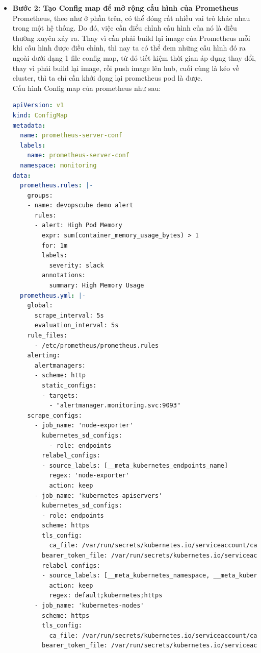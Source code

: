 \begin{itemize}
\begin{lstlisting}[language=yaml]
  \end{lstlisting}
  \item \textbf{Bước 2: Tạo Config map để mở rộng cấu hình của Prometheus}\\[0.2cm]
  Prometheus, theo như ở phần trên, có thể đóng rất nhiều vai trò khác nhau trong một hệ thống. Do đó, việc cần điểu chỉnh cấu hình của nó là điều thường xuyên xảy ra. Thay vì cần phải build lại image của Prometheus mỗi khi cấu hình được điều chỉnh, thì nay ta có thể đem những cấu hình đó ra ngoài dưới dạng 1 file config map, từ đó tiết kiệm thời gian áp dụng thay đổi, thay vì phải build lại image, rồi push image lên hub, cuối cùng là kéo về cluster, thì ta chỉ cần khởi đọng lại prometheus pod là được.\\[0.2cm]
  Cấu hình Config map của prometheus như sau:
  \begin{lstlisting}[language=yaml]
apiVersion: v1
kind: ConfigMap
metadata:
  name: prometheus-server-conf
  labels:
    name: prometheus-server-conf
  namespace: monitoring
data:
  prometheus.rules: |-
    groups:
    - name: devopscube demo alert
      rules:
      - alert: High Pod Memory
        expr: sum(container_memory_usage_bytes) > 1
        for: 1m
        labels:
          severity: slack
        annotations:
          summary: High Memory Usage
  prometheus.yml: |-
    global:
      scrape_interval: 5s
      evaluation_interval: 5s
    rule_files:
      - /etc/prometheus/prometheus.rules
    alerting:
      alertmanagers:
      - scheme: http
        static_configs:
        - targets:
          - "alertmanager.monitoring.svc:9093"
    scrape_configs:
      - job_name: 'node-exporter'
        kubernetes_sd_configs:
          - role: endpoints
        relabel_configs:
        - source_labels: [__meta_kubernetes_endpoints_name]
          regex: 'node-exporter'
          action: keep
      - job_name: 'kubernetes-apiservers'
        kubernetes_sd_configs:
        - role: endpoints
        scheme: https
        tls_config:
          ca_file: /var/run/secrets/kubernetes.io/serviceaccount/ca.crt
        bearer_token_file: /var/run/secrets/kubernetes.io/serviceaccount/token
        relabel_configs:
        - source_labels: [__meta_kubernetes_namespace, __meta_kubernetes_service_name, __meta_kubernetes_endpoint_port_name]
          action: keep
          regex: default;kubernetes;https
      - job_name: 'kubernetes-nodes'
        scheme: https
        tls_config:
          ca_file: /var/run/secrets/kubernetes.io/serviceaccount/ca.crt
        bearer_token_file: /var/run/secrets/kubernetes.io/serviceaccount/token

\end{lstlisting}
\end{itemize}
